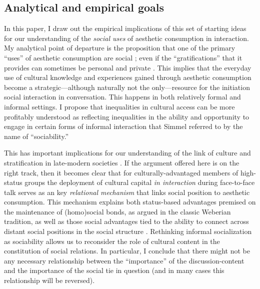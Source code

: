 \documentclass[11pt]{article}
\begin{document}
\subsection{Analytical and empirical goals}
In this paper, I draw out the empirical implications of this set of starting ideas for our understanding of the \emph{social uses} of aesthetic consumption in interaction.  My analytical point of departure is the proposition that one of the primary ``uses'' of aesthetic consumption are social \citep{dimaggio87};  even if the ``gratifications'' that it provides can sometimes be personal and private  \citep{denora00, hennion01, holbrook_hirschman82}.  This implies that the everyday use of cultural knowledge and experiences gained through aesthetic consumption become a strategic---although naturally not the only---resource for the initiation social interaction in conversation.  This happens in both relatively formal \citep{long03} and informal \citep{fine77} settings.   I propose that inequalities in cultural access can be more profitably understood as reflecting inequalities in the ability and opportunity to engage in certain forms of informal interaction that Simmel \citeyearpar{simmel49} referred to by the name of ``sociability.''  

This has important implications for our understanding of the link of culture and stratification in late-modern societies \citep{ollivier00}.  If the argument offered here is on the right track, then it becomes clear that for culturally-advantaged members of high-status groups the deployment of cultural capital \emph{in interaction} \citep{eliasoph_lichterman03} during face-to-face talk serves as an key \emph{relational mechanism} \citep{tilly98} that links social position to aesthetic consumption.  This mechanism explains both status-based advantages premised on the maintenance of (homo)social bonds, as argued in the classic Weberian tradition, as well as those social advantages tied to the ability to connect across distant social positions in the social structure \citep{erickson96, lizardo06a, lin99, pachuki_breiger10}.   Rethinking informal socialization as sociability allows us to reconsider the role of cultural content in the constitution of social relations.  In particular, I conclude that there might not be any necessary relationship between the ``importance'' of the discussion-content and the importance of the social tie in question (and in many cases this relationship will be reversed).
\end{document}
